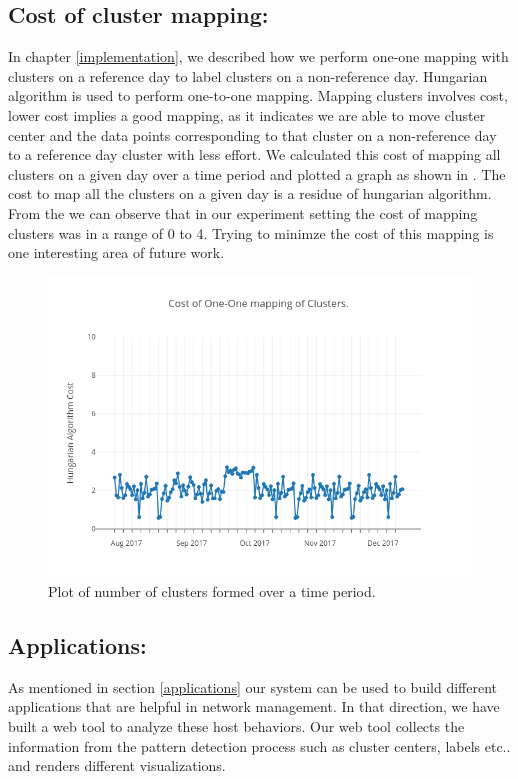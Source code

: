 \subsection{Cost of cluster mapping:}

In chapter \ref{implementation}, we described how we perform one-one mapping with clusters on a reference day to label clusters on a non-reference day. Hungarian algorithm is used to perform one-to-one mapping. Mapping clusters involves cost, lower cost implies a good mapping, as it indicates we are able to move cluster center and the data points corresponding to that cluster on a non-reference day to a reference day cluster with less effort. We calculated this cost of mapping all clusters on a given day over a time period and plotted a graph as shown in . The cost to map all the clusters on a given day is a residue of hungarian algorithm. From the  we can observe that in our experiment setting the cost of mapping clusters was in a range of 0 to 4. Trying to minimze the cost of this mapping is one interesting area of future work.

\begin{figure}[t]
	\centerline{\includegraphics{cost.png}}
	\caption{ Plot of number of clusters formed over a time period.}%
\end{figure}


\subsection{Applications:}

 As mentioned in section \ref{applications} our system can be used to build different applications that are helpful in network management. In that direction, we have built a web tool to analyze these host behaviors. Our web tool collects the information from the pattern detection process such as cluster centers, labels etc.. and renders different visualizations.
 
